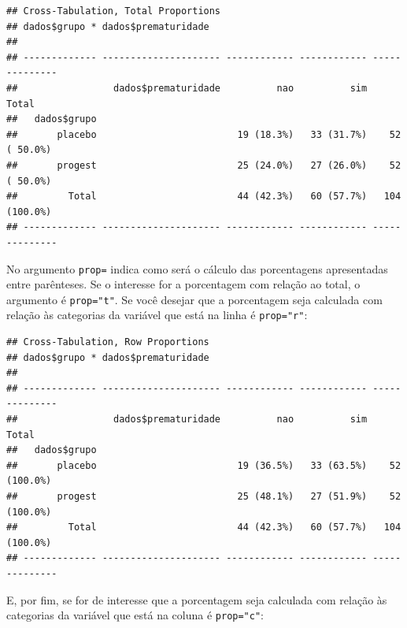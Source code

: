 \documentclass[
]{book}
\newenvironment{Shaded}{\begin{snugshade}}{\end{snugshade}}
\newcommand{\DataTypeTok}[1]{\textcolor[rgb]{0.13,0.29,0.53}{#1}}
\newcommand{\KeywordTok}[1]{\textcolor[rgb]{0.13,0.29,0.53}{\textbf{#1}}}
\newcommand{\NormalTok}[1]{#1}
\newcommand{\OperatorTok}[1]{\textcolor[rgb]{0.81,0.36,0.00}{\textbf{#1}}}
\newcommand{\StringTok}[1]{\textcolor[rgb]{0.31,0.60,0.02}{#1}}
\begin{document}
\begin{verbatim}
## Cross-Tabulation, Total Proportions  
## dados$grupo * dados$prematuridade  
## 
## ------------- --------------------- ------------ ------------ --------------
##                 dados$prematuridade          nao          sim          Total
##   dados$grupo                                                               
##       placebo                         19 (18.3%)   33 (31.7%)    52 ( 50.0%)
##       progest                         25 (24.0%)   27 (26.0%)    52 ( 50.0%)
##         Total                         44 (42.3%)   60 (57.7%)   104 (100.0%)
## ------------- --------------------- ------------ ------------ --------------
\end{verbatim}

No argumento \texttt{prop=} indica como será o cálculo das porcentagens apresentadas entre parênteses. Se o interesse for a porcentagem com relação ao total, o argumento é \texttt{prop="t"}. Se você desejar que a porcentagem seja calculada com relação às categorias da variável que está na linha é \texttt{prop="r"}:

\begin{Shaded}
\end{Shaded}

\begin{verbatim}
## Cross-Tabulation, Row Proportions  
## dados$grupo * dados$prematuridade  
## 
## ------------- --------------------- ------------ ------------ --------------
##                 dados$prematuridade          nao          sim          Total
##   dados$grupo                                                               
##       placebo                         19 (36.5%)   33 (63.5%)    52 (100.0%)
##       progest                         25 (48.1%)   27 (51.9%)    52 (100.0%)
##         Total                         44 (42.3%)   60 (57.7%)   104 (100.0%)
## ------------- --------------------- ------------ ------------ --------------
\end{verbatim}

E, por fim, se for de interesse que a porcentagem seja calculada com relação às categorias da variável que está na coluna é \texttt{prop="c"}:

\begin{Shaded}
\end{Shaded}
\end{document}
